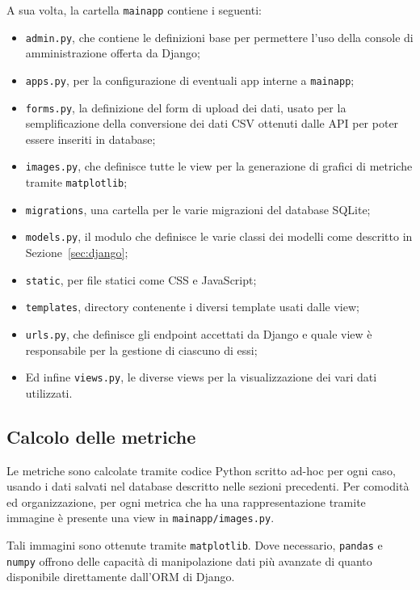 A sua volta, la cartella \texttt{mainapp} contiene i seguenti:
\begin{itemize}
  \item \texttt{admin.py}, che contiene le definizioni base per permettere l'uso
        della console di amministrazione offerta da Django;
  \item \texttt{apps.py}, per la configurazione di eventuali app interne a \texttt{mainapp};
  \item \texttt{forms.py}, la definizione del form di upload dei dati, usato per la
        semplificazione della conversione dei dati CSV ottenuti dalle API per
        poter essere inseriti in database;
  \item \texttt{images.py}, che definisce tutte le view per la generazione di
        grafici di metriche tramite \texttt{matplotlib};
  \item \texttt{migrations}, una cartella per le varie migrazioni del database SQLite;
  \item \texttt{models.py}, il modulo che definisce le varie classi dei modelli
        come descritto in Sezione~\ref{sec:django};
  \item \texttt{static}, per file statici come CSS e JavaScript;
  \item \texttt{templates}, directory contenente i diversi template usati dalle view;
  \item \texttt{urls.py}, che definisce gli endpoint accettati da Django e quale
        view è responsabile per la gestione di ciascuno di essi;
  \item Ed infine \texttt{views.py}, le diverse views per la visualizzazione
        dei vari dati utilizzati.
\end{itemize}

\subsection{Calcolo delle metriche}

Le metriche sono calcolate tramite codice Python scritto ad-hoc per ogni
caso, usando i dati salvati nel database descritto nelle sezioni precedenti.
Per comodità ed organizzazione, per ogni metrica che ha una rappresentazione
tramite immagine è presente una view in \texttt{mainapp/images.py}.

Tali immagini sono ottenute tramite \texttt{matplotlib}. Dove necessario,
\texttt{pandas} e \texttt{numpy} offrono delle capacità di manipolazione dati
più avanzate di quanto disponibile direttamente dall'ORM di Django.

